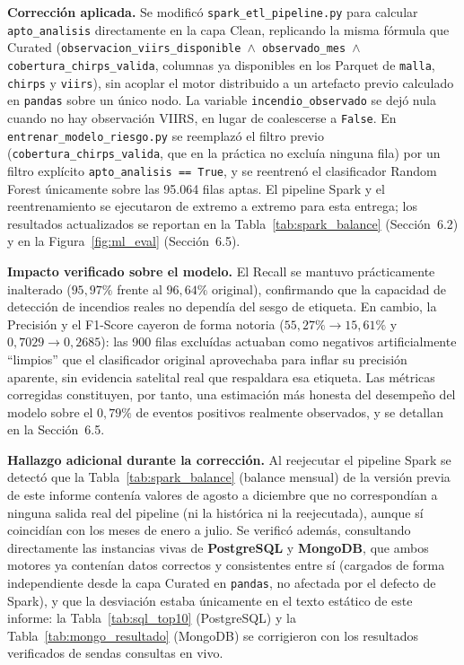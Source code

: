 \documentclass[11pt,a4paper]{article}
\begin{document}
\textbf{Correcci\'on aplicada.} Se modific\'o \texttt{spark\_etl\_pipeline.py} para calcular \texttt{apto\_analisis} directamente en la capa Clean, replicando la misma f\'ormula que Curated (\texttt{observacion\_viirs\_disponible \(\wedge\) observado\_mes \(\wedge\) cobertura\_chirps\_valida}, columnas ya disponibles en los Parquet de \texttt{malla}, \texttt{chirps} y \texttt{viirs}), sin acoplar el motor distribuido a un artefacto previo calculado en \texttt{pandas} sobre un \'unico nodo. La variable \texttt{incendio\_observado} se dej\'o nula cuando no hay observaci\'on VIIRS, en lugar de coalescerse a \texttt{False}. En \texttt{entrenar\_modelo\_riesgo.py} se reemplaz\'o el filtro previo (\texttt{cobertura\_chirps\_valida}, que en la pr\'actica no exclu\'ia ninguna fila) por un filtro expl\'icito \texttt{apto\_analisis == True}, y se reentren\'o el clasificador Random Forest \'unicamente sobre las 95.064 filas aptas. El pipeline Spark y el reentrenamiento se ejecutaron de extremo a extremo para esta entrega; los resultados actualizados se reportan en la Tabla~\ref{tab:spark_balance} (Secci\'on~6.2) y en la Figura~\ref{fig:ml_eval} (Secci\'on~6.5).

\textbf{Impacto verificado sobre el modelo.} El Recall se mantuvo pr\'acticamente inalterado ($95{,}97\%$ frente al $96{,}64\%$ original), confirmando que la capacidad de detecci\'on de incendios reales no depend\'ia del sesgo de etiqueta. En cambio, la Precisi\'on y el F1-Score cayeron de forma notoria ($55{,}27\% \rightarrow 15{,}61\%$ y $0{,}7029 \rightarrow 0{,}2685$): las 900 filas exclu\'idas actuaban como negativos artificialmente ``limpios'' que el clasificador original aprovechaba para inflar su precisi\'on aparente, sin evidencia satelital real que respaldara esa etiqueta. Las m\'etricas corregidas constituyen, por tanto, una estimaci\'on m\'as honesta del desempe\~no del modelo sobre el $0{,}79\%$ de eventos positivos realmente observados, y se detallan en la Secci\'on~6.5.

\textbf{Hallazgo adicional durante la correcci\'on.} Al reejecutar el pipeline Spark se detect\'o que la Tabla~\ref{tab:spark_balance} (balance mensual) de la versi\'on previa de este informe conten\'ia valores de agosto a diciembre que no correspond\'ian a ninguna salida real del pipeline (ni la hist\'orica ni la reejecutada), aunque s\'i coincid\'ian con los meses de enero a julio. Se verific\'o adem\'as, consultando directamente las instancias vivas de \textbf{PostgreSQL} y \textbf{MongoDB}, que ambos motores ya conten\'ian datos correctos y consistentes entre s\'i (cargados de forma independiente desde la capa Curated en \texttt{pandas}, no afectada por el defecto de Spark), y que la desviaci\'on estaba \'unicamente en el texto est\'atico de este informe: la Tabla~\ref{tab:sql_top10} (PostgreSQL) y la Tabla~\ref{tab:mongo_resultado} (MongoDB) se corrigieron con los resultados verificados de sendas consultas en vivo.
\end{document}
